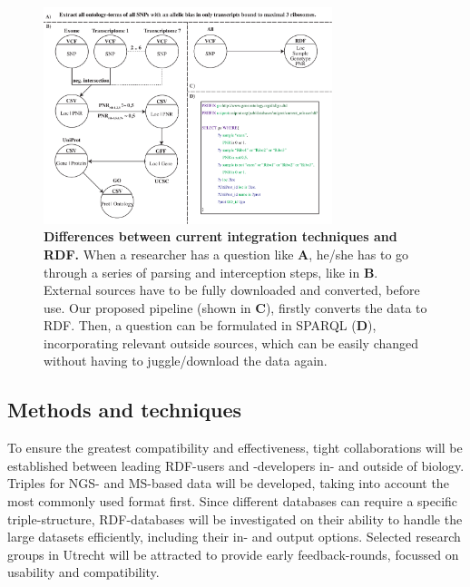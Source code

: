 \documentclass[twoside,fontsize=10pt]{article}
\begin{document}
\begin{figure}[H]
    \centering
    \includegraphics[width=0.75\textwidth]{DifferencesInDoingThings}
    \caption{\textbf{Differences between current integration techniques and RDF.} When a researcher has a question like \textbf{A}, he/she has to go through a series of parsing and interception steps, like in \textbf{B}. External sources have to be fully downloaded and converted, before use. Our proposed pipeline (shown in \textbf{C}), firstly converts the data to RDF. Then, a question can be formulated in SPARQL (\textbf{D}), incorporating relevant outside sources, which can be easily changed without having to juggle/download the data again.}
    \label{fig:awesome_image}
\end{figure}
\subsection*{Methods and techniques} %
To ensure the greatest compatibility and effectiveness, tight collaborations will be established between leading RDF-users and -developers in- and outside of biology. Triples for NGS- and MS-based data will be developed, taking into account the most commonly used format first. Since different databases can require a specific triple-structure, RDF-databases will be investigated on their ability to handle the large datasets efficiently, including their in- and output options. Selected research groups in Utrecht will be attracted to provide early feedback-rounds, focussed on usability and compatibility. 
\end{document}
